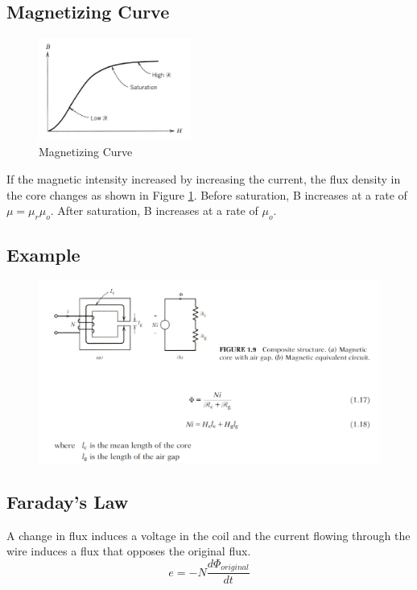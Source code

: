 \documentclass{article}
\begin{document}
    \subsection*{Magnetizing Curve}
        \begin{figure}[H]
            \centering
            \includegraphics[width=5cm]{figures/magnetizing_curve.PNG}
            \caption{Magnetizing Curve}
            \label{fig:magnetizing_curve}
        \end{figure}


    If the magnetic intensity increased by increasing the current, the flux density in the core changes as shown in Figure \ref{fig:magnetizing_curve}.
    Before saturation, B increases at a rate of $\mu = \mu_{r}\mu_{o}$. After saturation, B increases at a rate of $\mu_{o}$.

    \subsection*{Example}
    \begin{figure}[H]
            \centering
            \includegraphics[width=12cm]{figures/magnetic_circuit_example1.PNG}
    \end{figure}

    \subsection*{Faraday's Law}
    A change in flux induces a voltage in the coil and the current flowing through the wire induces a 
    flux that opposes the original flux.
    \begin{equation*}
        e = -N\frac{d\Phi_{original}}{dt}
    \end{equation*}
\end{document}

